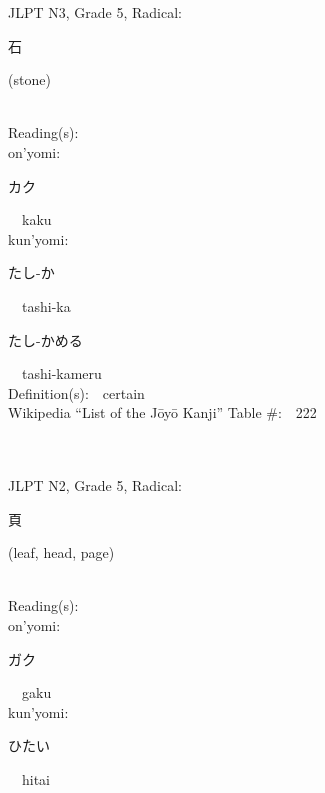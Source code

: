 \begin{multicols}{2}
{JLPT N3, Grade 5, Radical:\ \ {\begin{CJK}{UTF8}{min} 石 \end{CJK}} (stone) } \\
Reading(s):\ \ \\
{\hspace*{1em}}on'yomi:\ \ \\
{\hspace*{2em}}{\begin{CJK}{UTF8}{min} カク \end{CJK}}\ \ kaku\ \ \\
{\hspace*{1em}}kun'yomi:\ \ \\
{\hspace*{2em}}{\begin{CJK}{UTF8}{min} たし-か \end{CJK}}\ \ tashi-ka\ \ \\
{\hspace*{2em}}{\begin{CJK}{UTF8}{min} たし-かめる \end{CJK}}\ \ tashi-kameru\ \ \\
Definition(s):\ \ certain \\
Wikipedia ``List of the J\=oy\=o Kanji'' Table \#:\ \ 222 \\
\ \ \\
{\fontsize{34pt}{40pt}  }\ \ \\  %
{JLPT N2, Grade 5, Radical:\ \ {\begin{CJK}{UTF8}{min} 頁 \end{CJK}} (leaf, head, page) } \\
Reading(s):\ \ \\
{\hspace*{1em}}on'yomi:\ \ \\
{\hspace*{2em}}{\begin{CJK}{UTF8}{min} ガク \end{CJK}}\ \ gaku\ \ \\
{\hspace*{1em}}kun'yomi:\ \ \\
{\hspace*{2em}}{\begin{CJK}{UTF8}{min} ひたい \end{CJK}}\ \ hitai\ \ \\

\end{multicols}
